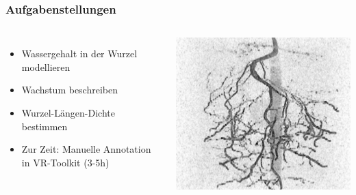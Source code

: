 \documentclass[final,ngerman,ignorenonframetext,compress]{beamer}
\begin{document}
\begin{frame}
	\frametitle{Aufgabenstellungen}
	\begin{columns}
		\begin{itemize}
			\item Wassergehalt in der Wurzel modellieren
			\item Wachstum beschreiben
			\item Wurzel-L\"angen-Dichte bestimmen
			\item Zur Zeit: Manuelle Annotation in VR-Toolkit (3-5h)
		\end{itemize}
		\includegraphics[width=\linewidth]{img/raw-4.png}
	\end{columns}
\end{frame}
\end{document}

